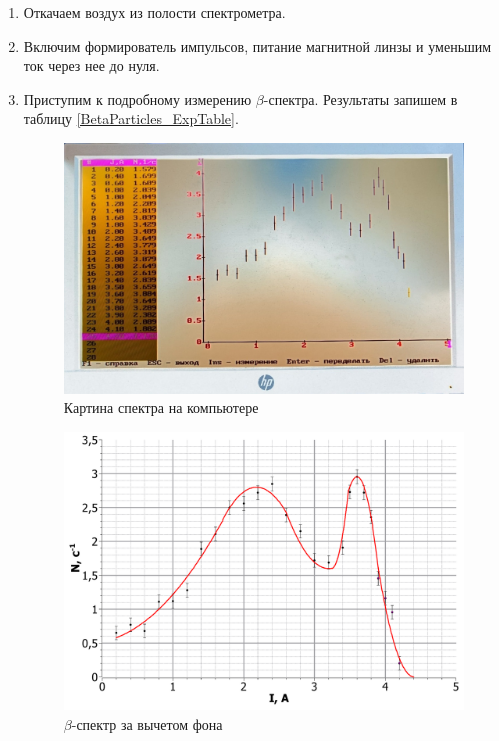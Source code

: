 	\begin{enumerate}
		\item Откачаем воздух из полости спектрометра.
		
		\item Включим формирователь импульсов, питание магнитной линзы и уменьшим ток через нее до нуля.
		
		\item Приступим к подробному измерению $\beta$-спектра. Результаты запишем в таблицу \ref{BetaParticles_ExpTable}.
		\begin{figure}[h!]
			\centering
			\includegraphics[width=0.9\linewidth]{Pictures/CompSpectreNeg}
			\caption{Картина спектра на компьютере}
		\end{figure}
	
		\begin{figure}[h!]
			\centering
			\includegraphics[width=\linewidth]{Pictures/Spectre.pdf}
			\caption{$\beta$-спектр за вычетом фона}
		\end{figure}
		

\end{enumerate}
